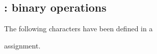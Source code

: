\documentclass{book}
\begin{document}
\def\prevclass{}\def\prevfaml{}

\subsection{ : binary operations}

The following characters have been defined
in a
\begin{disp}
\end{disp}
assignment.
\par\leavevmode\par
\end{document}
